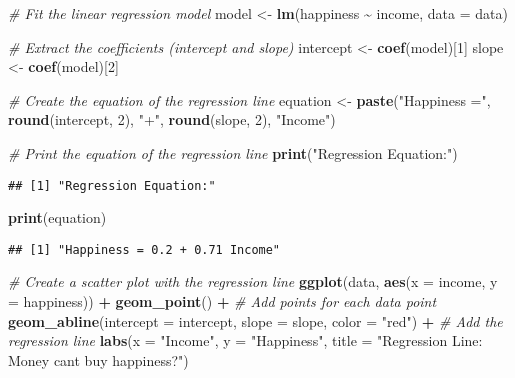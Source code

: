\documentclass[
]{article}
\newenvironment{Shaded}{\begin{snugshade}}{\end{snugshade}}
\newcommand{\AttributeTok}[1]{\textcolor[rgb]{0.13,0.29,0.53}{#1}}
\newcommand{\CommentTok}[1]{\textcolor[rgb]{0.56,0.35,0.01}{\textit{#1}}}
\newcommand{\DecValTok}[1]{\textcolor[rgb]{0.00,0.00,0.81}{#1}}
\newcommand{\FunctionTok}[1]{\textcolor[rgb]{0.13,0.29,0.53}{\textbf{#1}}}
\newcommand{\NormalTok}[1]{#1}
\newcommand{\OtherTok}[1]{\textcolor[rgb]{0.56,0.35,0.01}{#1}}
\newcommand{\SpecialCharTok}[1]{\textcolor[rgb]{0.81,0.36,0.00}{\textbf{#1}}}
\newcommand{\StringTok}[1]{\textcolor[rgb]{0.31,0.60,0.02}{#1}}
\begin{document}
\begin{Shaded}
\begin{Highlighting}[]
\CommentTok{\# Fit the linear regression model}
\NormalTok{model }\OtherTok{\textless{}{-}} \FunctionTok{lm}\NormalTok{(happiness }\SpecialCharTok{\textasciitilde{}}\NormalTok{ income, }\AttributeTok{data =}\NormalTok{ data)}

\CommentTok{\# Extract the coefficients (intercept and slope)}
\NormalTok{intercept }\OtherTok{\textless{}{-}} \FunctionTok{coef}\NormalTok{(model)[}\DecValTok{1}\NormalTok{]}
\NormalTok{slope }\OtherTok{\textless{}{-}} \FunctionTok{coef}\NormalTok{(model)[}\DecValTok{2}\NormalTok{]}

\CommentTok{\# Create the equation of the regression line}
\NormalTok{equation }\OtherTok{\textless{}{-}} \FunctionTok{paste}\NormalTok{(}\StringTok{"Happiness ="}\NormalTok{, }\FunctionTok{round}\NormalTok{(intercept, }\DecValTok{2}\NormalTok{), }\StringTok{"+"}\NormalTok{, }\FunctionTok{round}\NormalTok{(slope, }\DecValTok{2}\NormalTok{), }\StringTok{"Income"}\NormalTok{)}

\CommentTok{\# Print the equation of the regression line}
\FunctionTok{print}\NormalTok{(}\StringTok{"Regression Equation:"}\NormalTok{)}
\end{Highlighting}
\end{Shaded}

\begin{verbatim}
## [1] "Regression Equation:"
\end{verbatim}

\begin{Shaded}
\begin{Highlighting}[]
\FunctionTok{print}\NormalTok{(equation)}
\end{Highlighting}
\end{Shaded}

\begin{verbatim}
## [1] "Happiness = 0.2 + 0.71 Income"
\end{verbatim}

\begin{Shaded}
\begin{Highlighting}[]
\CommentTok{\# Create a scatter plot with the regression line}
\FunctionTok{ggplot}\NormalTok{(data, }\FunctionTok{aes}\NormalTok{(}\AttributeTok{x =}\NormalTok{ income, }\AttributeTok{y =}\NormalTok{ happiness)) }\SpecialCharTok{+}
  \FunctionTok{geom\_point}\NormalTok{() }\SpecialCharTok{+}  \CommentTok{\# Add points for each data point}
  \FunctionTok{geom\_abline}\NormalTok{(}\AttributeTok{intercept =}\NormalTok{ intercept, }\AttributeTok{slope =}\NormalTok{ slope, }\AttributeTok{color =} \StringTok{"red"}\NormalTok{) }\SpecialCharTok{+}  \CommentTok{\# Add the regression line}
  \FunctionTok{labs}\NormalTok{(}\AttributeTok{x =} \StringTok{"Income"}\NormalTok{, }\AttributeTok{y =} \StringTok{"Happiness"}\NormalTok{, }\AttributeTok{title =} \StringTok{"Regression Line: Money can\textquotesingle{}t buy happiness?"}\NormalTok{)}
\end{Highlighting}
\end{Shaded}
\end{document}
